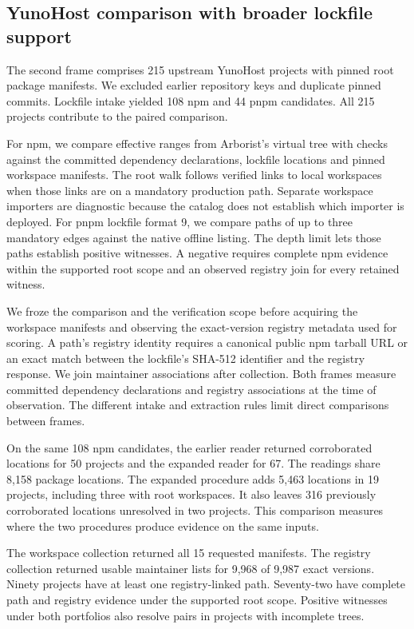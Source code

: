 \subsection{YunoHost comparison with broader lockfile support}
The second frame comprises 215 upstream YunoHost projects with pinned root package manifests. We excluded earlier repository keys and duplicate pinned commits. Lockfile intake yielded 108 npm and 44 pnpm candidates. All 215 projects contribute to the paired comparison.

For npm, we compare effective ranges from Arborist's virtual tree with checks against the committed dependency declarations, lockfile locations and pinned workspace manifests. The root walk follows verified links to local workspaces when those links are on a mandatory production path. Separate workspace importers are diagnostic because the catalog does not establish which importer is deployed. For pnpm lockfile format 9, we compare paths of up to three mandatory edges against the native offline listing. The depth limit lets those paths establish positive witnesses. A negative requires complete npm evidence within the supported root scope and an observed registry join for every retained witness.

We froze the comparison and the verification scope before acquiring the workspace manifests and observing the exact-version registry metadata used for scoring. A path's registry identity requires a canonical public npm tarball URL or an exact match between the lockfile's SHA-512 identifier and the registry response. We join maintainer associations after collection. Both frames measure committed dependency declarations and registry associations at the time of observation. The different intake and extraction rules limit direct comparisons between frames.

On the same 108 npm candidates, the earlier reader returned corroborated locations for 50 projects and the expanded reader for 67. The readings share 8,158 package locations. The expanded procedure adds 5,463 locations in 19 projects, including three with root workspaces. It also leaves 316 previously corroborated locations unresolved in two projects. This comparison measures where the two procedures produce evidence on the same inputs.

The workspace collection returned all 15 requested manifests. The registry collection returned usable maintainer lists for 9,968 of 9,987 exact versions. Ninety projects have at least one registry-linked path. Seventy-two have complete path and registry evidence under the supported root scope. Positive witnesses under both portfolios also resolve pairs in projects with incomplete trees.

